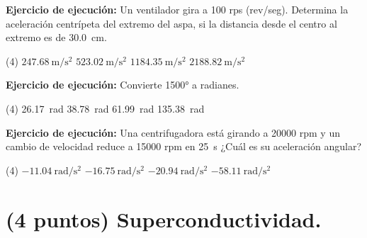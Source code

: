 \documentclass[12pt, letter]{exam}
\begin{document}
\begin{questions}
    \question \label{Ejercicio_01} \textbf{Ejercicio de ejecución: } Un ventilador gira a 100 rps (rev/seg). Determina la aceleración centrípeta del extremo del aspa, si la distancia desde el centro al extremo es de \SI{30.0}{\centi\meter}.
    \begin{tasks}(4)
        \task $\displaystyle \SI[per-mode=fraction]{247.68}{\meter\per\square\second}$
        \task $\displaystyle \SI[per-mode=fraction]{523.02}{\meter\per\square\second}$
        \task $\displaystyle \SI[per-mode=fraction]{1184.35}{\meter\per\square\second}$
        \task $\displaystyle \SI[per-mode=fraction]{2188.82}{\meter\per\square\second}$
    \end{tasks}
    \question \label{Ejercicio_02} \textbf{Ejercicio de ejecución: } Convierte \ang{1500} a radianes.
    \begin{tasks}(4)
        \task \SI{26.17}{\radian}
        \task \SI{38.78}{\radian}
        \task \SI{61.99}{\radian}
        \task \SI{135.38}{\radian}
    \end{tasks}
    \question \label{Ejercicio_03} \textbf{Ejercicio de ejecución: } Una centrifugadora está girando a 20000 rpm y un cambio de velocidad reduce a 15000 rpm en \SI{25}{\second} ¿Cuál es su aceleración angular?
    \begin{tasks}(4)
        \task $\displaystyle -\SI[per-mode=fraction]{11.04}{\radian\per\square\second}$
        \task $\displaystyle -\SI[per-mode=fraction]{16.75}{\radian\per\square\second}$
        \task $\displaystyle -\SI[per-mode=fraction]{20.94}{\radian\per\square\second}$
        \task $\displaystyle -\SI[per-mode=fraction]{58.11}{\radian\per\square\second}$
    \end{tasks}

    \section{(4 puntos) Superconductividad.}


\end{questions}
\end{document}

